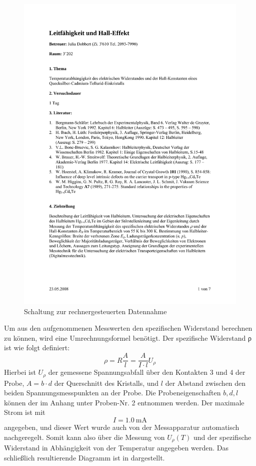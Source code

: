 \begin{figure}[htb]
 \centering
 \includegraphics[page=6,viewport=70 395 525 705,clip,width=\columnwidth,keepaspectratio]{../docs/Anleitung_Hall.pdf}
 \caption{Schaltung zur rechnergesteuerten Datennahme}
 \label{fig:Schaltung}
\end{figure}

Um aus den aufgenommenen Messwerten den spezifischen Widerstand berechnen zu
können, wird eine Umrechnungsformel benötigt. Der spezifische Widerstand ρ ist
wie folgt definiert:
\begin{equation}
ρ = R\frac{A}{l} = \frac{A}{I\cdot l} U_ρ
\label{eqn:rho}
\end{equation}
Hierbei ist $U_ρ$ der gemessene Spannungsabfall über den Kontakten 3 und 4 der Probe,
$A= b\cdot d$ der Querschnitt des Kristalls, und $l$ der Abstand zwischen den
beiden Spannungsmesspunkten an der Probe. Die Probeneigenschaften $b, d, l$ können
der  im Anhang unter Proben-Nr. 2 entnommen werden.
Der maximale Strom ist mit
\begin{equation}
 I = \SI{1,0}{\milli\ampere} 
\end{equation}
angegeben, und dieser Wert wurde auch von der Messapparatur automatisch nachgeregelt.
Somit kann also über die Messung von $U_ρ(T)$ und  der spezifische Widerstand in
Abhängigkeit von der Temperatur angegeben werden. Das schließlich resultierende
Diagramm ist in  dargestellt.

